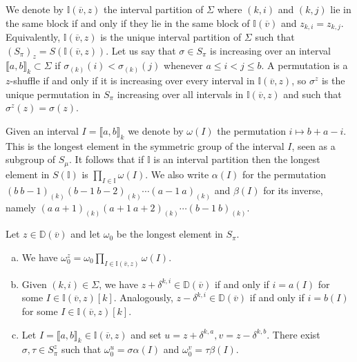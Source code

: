 \documentclass[11pt,fleqn]{amsart}
\newcommand\vv{\overline{v}}
\newcommand\II{\mathbb I}
\newcommand\interval[1]{\llbracket #1 \rrbracket}
\newcommand\DD{\mathbb D}
\begin{document}
We denote by $\II(\vv,z)$ the interval partition of $\Sigma$ where $(k,i)$ and 
$(k,j)$ lie in the same block if and only if they lie in the same block of 
$\II(\vv)$ and $z_{k,i} = z_{k,j}$. Equivalently, $\II(\vv,z)$ is the unique
interval partition of $\Sigma$ such that $(S_\pi)_z = S(\II(\vv, z))$. 
Let us say that $\sigma \in S_\pi$ is increasing over an interval 
$\interval{a,b}_k \subset \Sigma$ if $\sigma_{(k)}(i) < \sigma_{(k)}(j)$ 
whenever $a \leq i < j \leq b$. A permutation is a $z$-shuffle if and only if 
it is increasing over every interval in $\II(\vv, z)$, so $\sigma^z$ is the 
unique permutation in $S_\pi$ increasing over all intervals in $\II(\vv, z)$ 
and such that $\sigma^z(z) = \sigma(z)$.

Given an interval $I = \interval{a,b}_k$ we denote by $\omega(I)$ the 
permutation $i \mapsto  b+a-i$. This is the longest element in the symmetric
group of the interval $I$, seen as a subgroup of $S_\mu$. It follows 
that if $\II$ is an interval partition then the longest element in $S(\II)$ is 
$\prod_{I\in\II} \omega(I)$. We also write $\alpha(I)$ for the permutation 
$(b \ b-1)_{(k)} (b-1 \ b-2)_{(k)} \cdots (a-1 \ a)_{(k)}$ and $\beta(I)$ for 
its inverse, namely $(a \ a+1)_{(k)} (a+1 \ a+2)_{(k)} \cdots(b-1 \ b)_{(k)}$. 
\begin{Lemma}
\label{L:omega-delta}
Let $z\in \DD(\vv)$ and let $\omega_0$ be the longest element in $S_\pi$.
\begin{enumerate}[(a)]
\item 
\label{i:omega-z}
We have $\omega_0^z = \omega_0 \prod_{I \in \II(\vv, z)} \omega(I)$.

\item 
\label{i:D-delta}
Given $(k,i) \in \Sigma$, we have $z + \delta^{k,i} \in \DD(\vv)$ if and only 
	if $i = a(I)$ for some $I \in \II(\vv,z)[k]$. Analogously, $z-\delta^{k,i} 
	\in \DD(\vv)$ if and only if $i = b(I)$ for some $I \in \II(\vv,z)[k]$.

\item 
\label{i:omega-delta}
Let $I = \interval{a,b}_k \in \II(\vv,z)$ and set $u=z+\delta^{k,a}, 
	v = z- \delta^{k,b}$. There exist $\sigma, \tau \in S_\pi^z$ such that 
	$\omega_0^u = \sigma \alpha(I)$ and $\omega_0^v = \tau \beta(I)$. 
\end{enumerate}
\end{Lemma}
\end{document}
